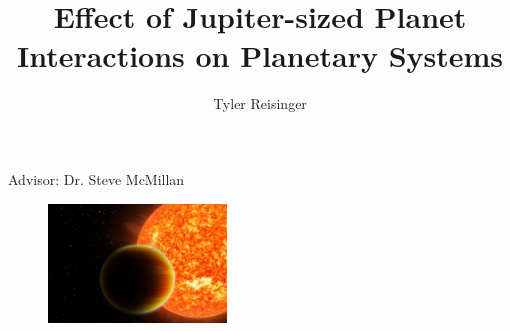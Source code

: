\documentclass{beamer}
\title{Effect of Jupiter-sized Planet Interactions on Planetary Systems}
\author{Tyler Reisinger}
\date{}
\begin{document}
\begin{frame}
    \maketitle
    \begin{center}
        Advisor: Dr. Steve McMillan
    \end{center}
    \begin{figure}
        \centering
        \includegraphics[height=1.25in]{Image1_HotJupiter1}
    \end{figure}
\end{frame}
\end{document}
